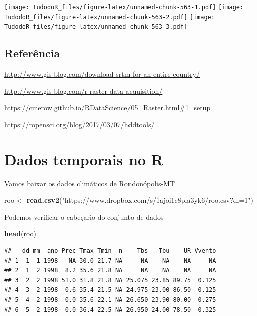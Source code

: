 \documentclass[
]{book}
\newenvironment{Shaded}{\begin{snugshade}}{\end{snugshade}}
\newcommand{\KeywordTok}[1]{\textcolor[rgb]{0.13,0.29,0.53}{\textbf{#1}}}
\newcommand{\NormalTok}[1]{#1}
\newcommand{\StringTok}[1]{\textcolor[rgb]{0.31,0.60,0.02}{#1}}
\begin{document}
\texttt{[image: TudodoR\_files/figure-latex/unnamed-chunk-563-1.pdf]} \texttt{[image: TudodoR\_files/figure-latex/unnamed-chunk-563-2.pdf]} \texttt{[image: TudodoR\_files/figure-latex/unnamed-chunk-563-3.pdf]}

\hypertarget{referuxeancia-7}{%
\subsection{Referência}\label{referuxeancia-7}}

\url{http://www.gis-blog.com/download-srtm-for-an-entire-country/}

\url{http://www.gis-blog.com/r-raster-data-acquisition/}

\url{https://cmerow.github.io/RDataScience/05_Raster.html\#1_setup}

\url{https://ropensci.org/blog/2017/03/07/hddtools/}

\hypertarget{dados-temporais-no-r}{%
\section{Dados temporais no R}\label{dados-temporais-no-r}}

Vamos baixar os dados climáticos de Rondonópolis-MT

\begin{Shaded}
\begin{Highlighting}[]
\NormalTok{roo <-}\StringTok{ }\KeywordTok{read.csv2}\NormalTok{(}\StringTok{"https://www.dropbox.com/s/1ajoi1c8pla3yk6/roo.csv?dl=1"}\NormalTok{)}
\end{Highlighting}
\end{Shaded}

Podemos verificar o cabeçario do conjunto de dados

\begin{Shaded}
\begin{Highlighting}[]
\KeywordTok{head}\NormalTok{(roo)}
\end{Highlighting}
\end{Shaded}

\begin{verbatim}
##   dd mm  ano Prec Tmax Tmin  n    Tbs   Tbu    UR Vvento
## 1  1  1 1998   NA 30.0 21.7 NA     NA    NA    NA     NA
## 2  1  2 1998  8.2 35.6 21.8 NA     NA    NA    NA     NA
## 3  2  2 1998 51.0 31.8 21.8 NA 25.075 23.85 89.75  0.125
## 4  3  2 1998  0.6 35.4 21.5 NA 24.975 23.00 86.50  0.125
## 5  4  2 1998  0.0 35.6 22.1 NA 26.650 23.90 80.00  0.275
## 6  5  2 1998  0.0 36.4 22.5 NA 26.950 24.00 78.50  0.325
\end{verbatim}
\end{document}
